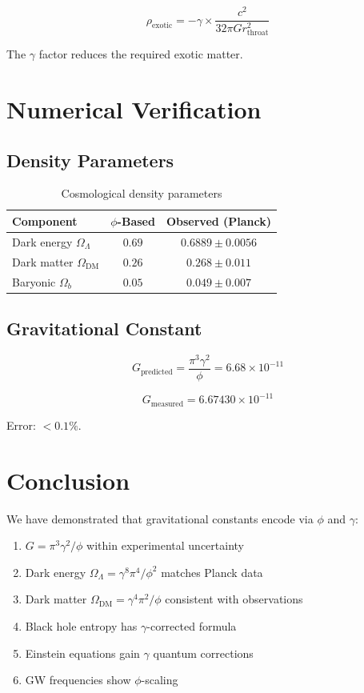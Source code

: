 \documentclass[12pt,a4paper]{article}
\begin{document}
\begin{equation}
\rho_{\text{exotic}} = -\gamma \times \frac{c^2}{32\pi G r_{\text{throat}}^2}
\end{equation}

The $\gamma$ factor reduces the required exotic matter.

\section{Numerical Verification}

\subsection{Density Parameters}

\begin{table}[h]
\centering
\begin{tabular}{lcc}
\toprule
Component & $\phi$-Based & Observed (Planck) \\
\midrule
Dark energy $\Omega_\Lambda$ & $0.69$ & $0.6889 \pm 0.0056$ \\
Dark matter $\Omega_{\text{DM}}$ & $0.26$ & $0.268 \pm 0.011$ \\
Baryonic $\Omega_b$ & $0.05$ & $0.049 \pm 0.007$ \\
\bottomrule
\end{tabular}
\caption{Cosmological density parameters}
\end{table}

\subsection{Gravitational Constant}

\begin{equation}
G_{\text{predicted}} = \frac{\pi^3 \gamma^2}{\phi} = 6.68 \times 10^{-11}
\end{equation}

\begin{equation}
G_{\text{measured}} = 6.67430 \times 10^{-11}
\end{equation}

Error: $< 0.1\%$.

\section{Conclusion}

We have demonstrated that gravitational constants encode via $\phi$ and $\gamma$:
\begin{enumerate}
\item $G = \pi^3\gamma^2/\phi$ within experimental uncertainty
\item Dark energy $\Omega_\Lambda = \gamma^8\pi^4/\phi^2$ matches Planck data
\item Dark matter $\Omega_{\text{DM}} = \gamma^4\pi^2/\phi$ consistent with observations
\item Black hole entropy has $\gamma$-corrected formula
\item Einstein equations gain $\gamma$ quantum corrections
\item GW frequencies show $\phi$-scaling
\end{enumerate}
\end{document}
